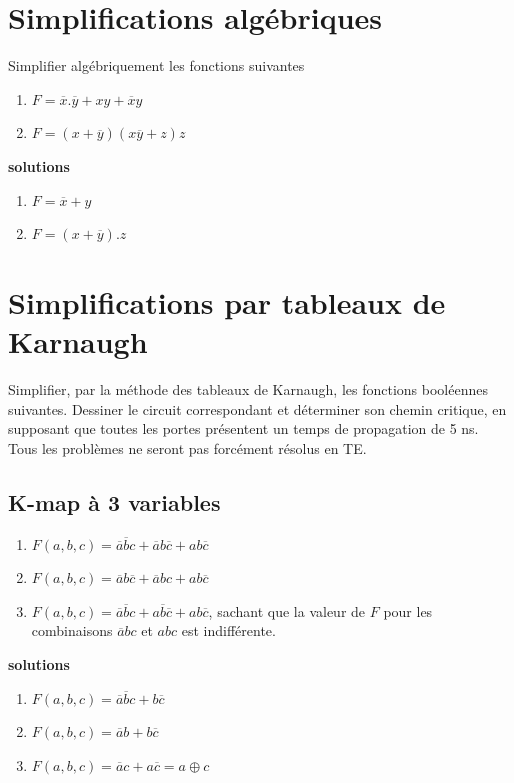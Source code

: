 \documentclass[a4paper,11pt]{article}
\begin{document}
\section{Simplifications algébriques}
Simplifier algébriquement les  fonctions suivantes

\begin{enumerate}
\item $F=\overline{x}.\overline{y} + xy+\overline{x}y$
\item $F=(x+\overline{y})(x\overline{y}+z)z$
\end{enumerate}

\begin{cadre}
  {\bf solutions}
  \begin{enumerate}
  \item $F=\overline{x} + y$
  \item $F=(x+\overline{y}).z$
  \end{enumerate}
\end{cadre}

\section{Simplifications par tableaux de Karnaugh}
Simplifier, par la méthode des tableaux de Karnaugh, les fonctions booléennes suivantes. Dessiner le circuit correspondant et déterminer son chemin critique, en supposant que toutes les portes présentent un temps de propagation de 5 ns. Tous les problèmes ne seront pas forcément résolus en TE.

\subsection{K-map à 3 variables}
\begin{enumerate}
\item $F(a,b,c)=\overline{a}\overline{b}c+\overline{a}b\overline{c}+ab\overline{c}$
\item $F(a,b,c)=\overline{a}b\overline{c}+\overline{a}bc+ab\overline{c}$
\item $F(a,b,c)=\overline{a}\overline{b}c+a\overline{b}\overline{c}+ab\overline{c}$, sachant que la valeur de $F$ pour les combinaisons $\overline{a}bc$ et $abc$ est indifférente.
\end{enumerate}
\begin{cadre}

{\bf solutions}
  \begin{enumerate}
  \item $F(a,b,c)=\overline{a}\overline{b}c+b\overline{c}$
  \item $F(a,b,c)=\overline{a}b+b\overline{c}$
  \item $F(a,b,c)=\overline{a}c+a\overline{c}=a\oplus c$
  \end{enumerate}
\end{cadre}
\end{document}
